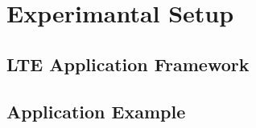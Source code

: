\chapter{Experimantal Setup}
\label{ch:ExSetup}

\section{LTE Application Framework}\label{sec:LTEAFW}
\section{Application Example}\label{sec:AppEx}




